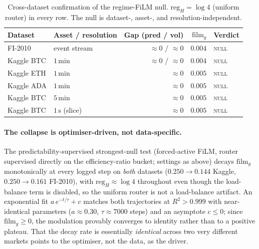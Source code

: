 \begin{table}[t]
\centering
\small
\begin{tabular}{llrrl}
\toprule
Dataset & Asset / resolution & Gap (pred / vol) & $\mathrm{film}_g$ & Verdict \\
\midrule
FI-2010      & event stream          & $\approx 0$ / $\approx 0$ & $0.004$ & \textsc{null} \\
Kaggle BTC   & $1\,\mathrm{min}$      & $\approx 0$ / $\approx 0$ & $0.004$ & \textsc{null} \\
Kaggle ETH   & $1\,\mathrm{min}$      & $\approx 0$               & $0.005$ & \textsc{null} \\
Kaggle ADA   & $1\,\mathrm{min}$      & $\approx 0$               & $0.005$ & \textsc{null} \\
Kaggle BTC   & $5\,\mathrm{min}$      & $\approx 0$               & $0.005$ & \textsc{null} \\
Kaggle BTC   & $1\,\mathrm{s}$ (slice)& $\approx 0$               & $0.005$ & \textsc{null} \\
\bottomrule
\end{tabular}
\caption{Cross-dataset confirmation of the regime-FiLM null. $\mathrm{reg}_H = \log 4$
(uniform router) in every row. The null is dataset-, asset-, and resolution-independent.}
\label{tab:film_null_xdata}
\end{table}

\paragraph{The collapse is optimiser-driven, not data-specific.}
The predictability-supervised strongest-null test (forced-active FiLM, router supervised
directly on the efficiency-ratio bucket; settings as above) decays $\mathrm{film}_g$
monotonically at every logged step on \emph{both} datasets ($0.250 \to 0.144$ Kaggle,
$0.250 \to 0.161$ FI-2010), with $\mathrm{reg}_H \approx \log 4$ throughout even though
the load-balance term is disabled, so the uniform router is not a load-balance artifact.
An exponential fit $a\,e^{-t/\tau}+c$ matches both trajectories at $R^2 > 0.999$ with
near-identical parameters ($a \approx 0.30$, $\tau \approx 7000$ steps) and an asymptote
$c \le 0$; since $\mathrm{film}_g \ge 0$, the modulation provably converges to identity
rather than to a positive plateau. That the decay rate is essentially \emph{identical}
across two very different markets points to the optimiser, not the data, as the driver.

